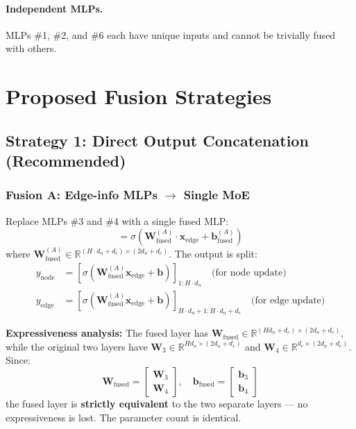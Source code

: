 \documentclass[11pt,a4paper]{article}
\newcommand{\R}{\mathbb{R}}
\newcommand{\act}{\sigma}
\newcommand{\W}{\mathbf{W}}
\newcommand{\bb}{\mathbf{b}}
\newcommand{\x}{\mathbf{x}}
\begin{document}
\paragraph{Independent MLPs.}
MLPs \#1, \#2, and \#6 each have unique inputs and cannot be trivially fused with others.

\section{Proposed Fusion Strategies}

\subsection{Strategy 1: Direct Output Concatenation (Recommended)}

\subsubsection{Fusion A: Edge-info MLPs $\to$ Single MoE}

Replace MLPs \#3 and \#4 with a single fused MLP:
\begin{equation}
    [\underbrace{y_{\text{node}}}_{\R^{H \cdot d_n}};\; \underbrace{y_{\text{edge}}}_{\R^{d_e}}] = \act\!\left(\W_{\text{fused}}^{(A)} \cdot \x_{\text{edge}} + \bb_{\text{fused}}^{(A)}\right)
\end{equation}
where $\W_{\text{fused}}^{(A)} \in \R^{(H \cdot d_n + d_e) \times (2d_n + d_e)}$. The output is split:
\begin{align}
    y_{\text{node}} &= [\act(\W_{\text{fused}}^{(A)} \x_{\text{edge}} + \bb)]_{1:H \cdot d_n} \quad \text{(for node update)} \\
    y_{\text{edge}} &= [\act(\W_{\text{fused}}^{(A)} \x_{\text{edge}} + \bb)]_{H \cdot d_n + 1 : H \cdot d_n + d_e} \quad \text{(for edge update)}
\end{align}

\textbf{Expressiveness analysis:} The fused layer has $\W_{\text{fused}} \in \R^{(Hd_n + d_e) \times (2d_n + d_e)}$, while the original two layers have $\W_3 \in \R^{Hd_n \times (2d_n + d_e)}$ and $\W_4 \in \R^{d_e \times (2d_n + d_e)}$. Since:
\begin{equation}
    \W_{\text{fused}} = \begin{bmatrix} \W_3 \\ \W_4 \end{bmatrix}, \quad
    \bb_{\text{fused}} = \begin{bmatrix} \bb_3 \\ \bb_4 \end{bmatrix}
\end{equation}
the fused layer is \textbf{strictly equivalent} to the two separate layers --- no expressiveness is lost. The parameter count is identical.
\end{document}
